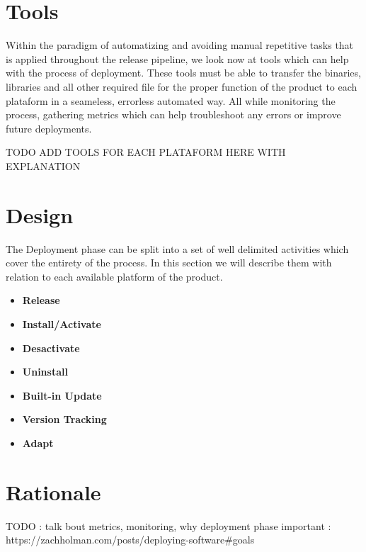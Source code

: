 \documentclass[12pt]{report}
\begin{document}
\section{Tools}
Within the paradigm of automatizing and avoiding manual repetitive tasks that is applied throughout the release pipeline, we look now at tools which can help with the process of deployment. These tools must be able to transfer the binaries, libraries and all other required file for the proper function of the product to each plataform in a seameless, errorless automated way. All while monitoring the process, gathering metrics which can help troubleshoot any errors or improve future deployments.

TODO ADD TOOLS FOR EACH PLATAFORM HERE WITH EXPLANATION

\section{Design}
The Deployment phase can be split into a set of well delimited activities which cover the entirety of the process. In this section we will describe them with relation to each available platform of the product.

\begin{itemize}
    \item \textbf{Release}
    \item \textbf{Install/Activate}
    \item \textbf{Desactivate}
    \item \textbf{Uninstall}
    \item \textbf{Built-in Update}
    \item \textbf{Version Tracking}
    \item \textbf{Adapt}
\end{itemize}
\section{Rationale}





TODO : talk bout metrics, monitoring, why deployment phase important : https://zachholman.com/posts/deploying-software#goals
\end{document}
